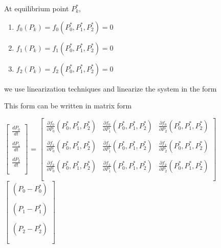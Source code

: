 \documentclass[paper=a4, fontsize=11pt, twoside, BCOR=12mm, parskip=full, listof=totoc]{scrreprt}
\begin{document}
At equilibrium point $P_{k}^*$, 

\begin{enumerate} %
  \item $f_0(P_k)= f_0(P_{0}^*,P_{1}^*,P_{2}^*) = 0$
  \item $f_1(P_k)= f_1(P_{0}^*,P_{1}^*,P_{2}^*) = 0$
  \item $f_2(P_k)= f_2(P_{0}^*,P_{1}^*,P_{2}^*) = 0$
\end{enumerate}

we use linearization techniques and linearize the system in the form

This form can be written in matrix form 

$\begin{bmatrix}
\frac{dP_0}{dt} \\
\\
\frac{dP_1}{dt} \\
\\
\frac{dP_2}{dt} \\
\\
\end{bmatrix}$
=
$\begin{bmatrix}
\frac{\partial f_0}{\partial P_0}(P_{0}^*,P_{1}^*,P_{2}^*) & \frac{\partial f_0}{\partial P_1}(P_{0}^*,P_{1}^*,P_{2}^*) & \frac{\partial f_0}{\partial P_2}(P_{0}^*,P_{1}^*,P_{2}^*) \\
\\
\frac{\partial f_1}{\partial P_0}(P_{0}^*,P_{1}^*,P_{2}^*) & \frac{\partial f_1}{\partial P_1}(P_{0}^*,P_{1}^*,P_{2}^*) & \frac{\partial f_1}{\partial P_2}(P_{0}^*,P_{1}^*,P_{2}^*) \\
\\
\frac{\partial f_2}{\partial P_0}(P_{0}^*,P_{1}^*,P_{2}^*) & \frac{\partial f_2}{\partial P_1}(P_{0}^*,P_{1}^*,P_{2}^*) &  \frac{\partial f_2}{\partial P_2}(P_{0}^*,P_{1}^*,P_{2}^*)\\
\\
\end{bmatrix}$
$\begin{bmatrix}
(P_0 - P_{0}^*) \\
\\
(P_1 - P_{1}^*) \\
\\
(P_2 - P_{2}^*) \\
\\
\end{bmatrix}$
\end{document}
